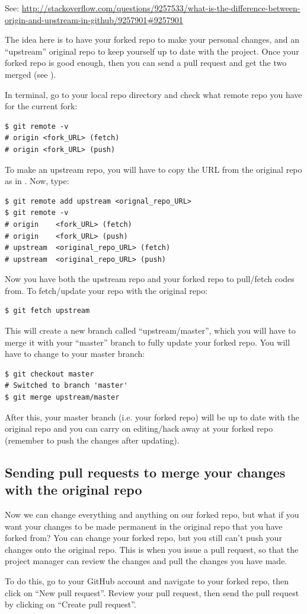 \documentclass[a4paper, 12pt]{article}
\begin{document}
{\scriptsize See: \url{http://stackoverflow.com/questions/9257533/what-is-the-difference-between-origin-and-upstream-in-github/9257901#9257901 } \\}

The idea here is to have your forked repo to make your personal changes, and an ``upstream'' original repo to keep yourself up to date with the project.
Once your forked repo is good enough, then you can send a pull request and get the two merged (see {\itshape {}}).

In terminal, go to your local repo directory and check what remote repo you have for the current fork:
\begin{lstlisting}
$ git remote -v
# origin <fork_URL> (fetch)
# origin <fork_URL> (push)
\end{lstlisting}
To make an upstream repo, you will have to copy the URL from the original repo as in {\itshape {}}.
Now, type:
\begin{lstlisting}
$ git remote add upstream <orignal_repo_URL>
$ git remote -v
# origin    <fork_URL> (fetch)
# origin    <fork_URL> (push)
# upstream  <original_repo_URL> (fetch)
# upstream  <original_repo_URL> (push)
\end{lstlisting}
Now you have both the upstream repo and your forked repo to pull/fetch codes from.
To fetch/update your repo with the original repo:
\begin{lstlisting}
$ git fetch upstream
\end{lstlisting}
This will create a new branch called ``upstream/master'', which you will have to merge it with your ``master'' branch to fully update your forked repo.
You will have to change to your master branch:
\begin{lstlisting}
$ git checkout master
# Switched to branch 'master'
$ git merge upstream/master
\end{lstlisting}
After this, your master branch (i.e. your forked repo) will be up to date with the original repo and you can carry on editing/hack away at your forked repo (remember to push the changes after updating).

\subsection*{Sending pull requests to merge your changes with the original repo}
\label{subsec:sendpullrequest}

Now we can change everything and anything on our forked repo, but what if you want your changes to be made permanent in the original repo that you have forked from?
You can change your forked repo, but you still can't push your changes onto the original repo.
This is when you issue a pull request, so that the project manager can review the changes and pull the changes you have made.

To do this, go to your GitHub account and navigate to your forked repo, then click on ``New pull request''.
Review your pull request, then send the pull request by clicking on ``Create pull request''.
\end{document}
